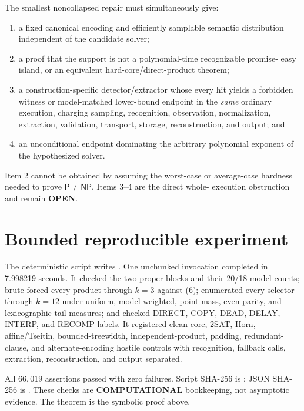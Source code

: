 \documentclass[11pt]{article}
\newcommand{\COMP}{\textbf{COMPUTATIONAL}}
\newcommand{\OPEN}{\textbf{OPEN}}
\begin{document}
The smallest noncollapsed repair must simultaneously give:
\begin{enumerate}[leftmargin=*]
\item a fixed canonical encoding and efficiently samplable semantic
distribution independent of the candidate solver;
\item a proof that the support is not a polynomial-time recognizable promise-
easy island, or an equivalent hard-core/direct-product theorem;
\item a construction-specific detector/extractor whose every hit yields a
forbidden witness or model-matched lower-bound endpoint in the \emph{same}
ordinary execution, charging sampling, recognition, observation,
normalization, extraction, validation, transport, storage, reconstruction,
and output; and
\item an unconditional endpoint dominating the arbitrary polynomial exponent
of the hypothesized solver.
\end{enumerate}
Item 2 cannot be obtained by assuming the worst-case or average-case hardness
needed to prove \(\mathsf P\ne\mathsf{NP}\). Items 3--4 are the direct whole-
execution obstruction and remain \OPEN.

\section{Bounded reproducible experiment}
The deterministic script
writes
.
One unchunked invocation completed in 7.998219 seconds. It checked the two
proper blocks and their 20/18 model counts; brute-forced every product through
\(k=3\) against (6); enumerated every selector through \(k=12\) under uniform,
model-weighted, point-mass, even-parity, and lexicographic-tail measures; and
checked DIRECT, COPY, DEAD, DELAY, INTERP, and RECOMP labels. It registered
clean-core, 2SAT, Horn, affine/Tseitin, bounded-treewidth, independent-product,
padding, redundant-clause, and alternate-encoding hostile controls with
recognition, fallback calls, extraction, reconstruction, and output separated.

All \(66{,}019\) assertions passed with zero failures. Script SHA-256 is
;
JSON SHA-256 is
.
These checks are \COMP{} bookkeeping, not asymptotic evidence. The theorem is
the symbolic proof above.
\end{document}
